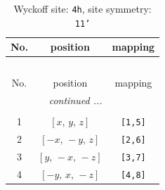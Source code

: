 \documentclass[fleqn,8pt]{jsarticle}
\begin{document}
\begin{longtable}{ccc}
\caption{Wyckoff site: {\tt 4h}, site symmetry: {\tt 11'}}
 \\
 \hline \hline
No. & position & mapping \\ \hline \endfirsthead

\multicolumn{2}{l}{\tablename\ \thetable{}} \\
 \hline \hline
No. & position & mapping \\ \hline \endhead

 \hline \hline
\multicolumn{2}{r}{\footnotesize\it continued ...} \\ \endfoot

 \hline \hline
\multicolumn{2}{r}{} \\ \endlastfoot

1 & $\left[ x,\, y,\, z \right]$ & {\tt [1,5]} \\ \hline
2 & $\left[ - x,\, - y,\, z \right]$ & {\tt [2,6]} \\ \hline
3 & $\left[ y,\, - x,\, - z \right]$ & {\tt [3,7]} \\ \hline
4 & $\left[ - y,\, x,\, - z \right]$ & {\tt [4,8]} \\
\end{longtable}
\end{document}
